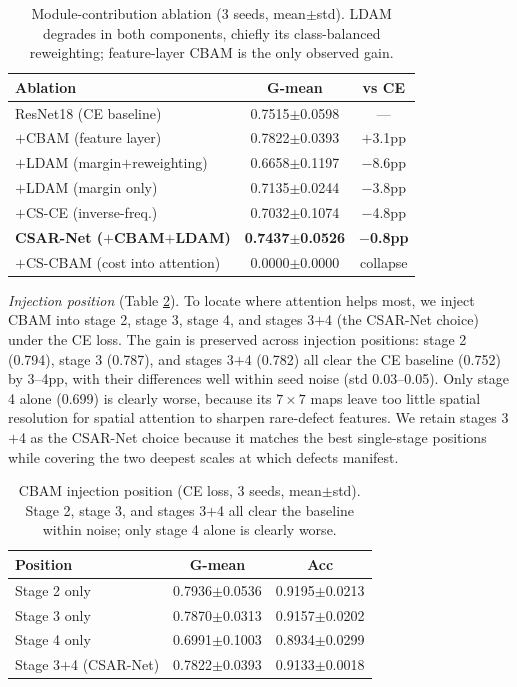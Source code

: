 \documentclass[a4paper,fleqn]{cas-sc}
\begin{document}
\begin{sloppypar}
	\begin{table}[pos=htbp]
		\footnotesize
		\caption{Module-contribution ablation (3 seeds, mean$\pm$std). LDAM degrades in both components, chiefly its class-balanced reweighting; feature-layer CBAM is the only observed gain.}
		\label{tbl:abl}
		\centering
		\begin{tabular}{lcc}
	\hline
	\textbf{Ablation} & \textbf{G-mean} & \textbf{vs CE} \\ \hline
	ResNet18 (CE baseline) & 0.7515$\pm$0.0598 & --- \\
	$+$CBAM (feature layer) & 0.7822$\pm$0.0393 & $+$3.1pp \\
	$+$LDAM (margin$+$reweighting) & 0.6658$\pm$0.1197 & $-$8.6pp \\
	$+$LDAM (margin only) & 0.7135$\pm$0.0244 & $-$3.8pp \\
	$+$CS-CE (inverse-freq.) & 0.7032$\pm$0.1074 & $-$4.8pp \\
	\textbf{CSAR-Net ($+$CBAM$+$LDAM)} & \textbf{0.7437$\pm$0.0526} & \textbf{$-$0.8pp} \\
	$+$CS-CBAM (cost into attention) & 0.0000$\pm$0.0000 & collapse \\
	\hline
	\end{tabular}
	\end{table}

	\par{
		\emph{Injection position} (Table \ref{tbl:ablpos}). To locate where attention helps most, we inject CBAM into stage 2, stage 3, stage 4, and stages 3$+$4 (the CSAR-Net choice) under the CE loss. The gain is preserved across injection positions: stage 2 (0.794), stage 3 (0.787), and stages 3$+$4 (0.782) all clear the CE baseline (0.752) by 3--4pp, with their differences well within seed noise (std 0.03--0.05). Only stage 4 alone (0.699) is clearly worse, because its $7\times7$ maps leave too little spatial resolution for spatial attention to sharpen rare-defect features. We retain stages 3$+$4 as the CSAR-Net choice because it matches the best single-stage positions while covering the two deepest scales at which defects manifest.
	}

	\begin{table}[pos=htbp]
		\footnotesize
		\caption{CBAM injection position (CE loss, 3 seeds, mean$\pm$std). Stage 2, stage 3, and stages 3$+$4 all clear the baseline within noise; only stage 4 alone is clearly worse.}
		\label{tbl:ablpos}
		\centering
		\begin{tabular}{lcc}
			\hline
			\textbf{Position} & \textbf{G-mean} & \textbf{Acc} \\ \hline
			Stage 2 only & 0.7936$\pm$0.0536 & 0.9195$\pm$0.0213 \\
			Stage 3 only & 0.7870$\pm$0.0313 & 0.9157$\pm$0.0202 \\
			Stage 4 only & 0.6991$\pm$0.1003 & 0.8934$\pm$0.0299 \\
			Stage 3$+$4 (CSAR-Net) & 0.7822$\pm$0.0393 & 0.9133$\pm$0.0018 \\ \hline
		\end{tabular}
	\end{table}


\end{sloppypar}
\end{document}
